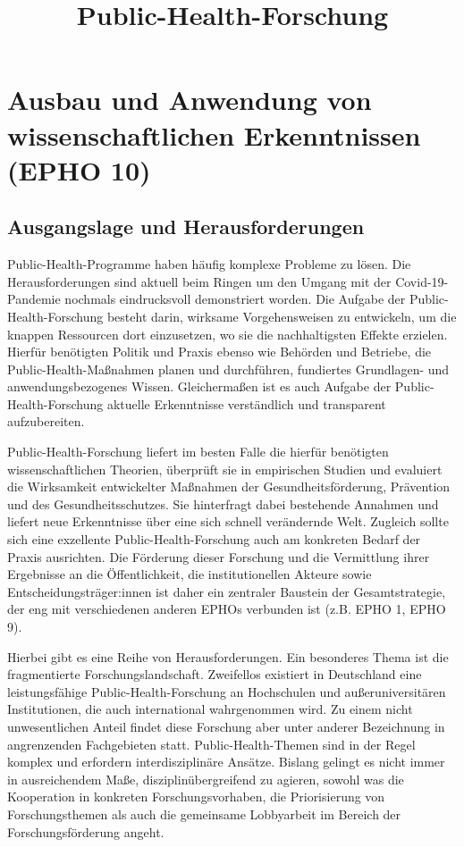 \documentclass{article}
\begin{document}
\title{Public-Health-Forschung}

\maketitle


\section{Ausbau und Anwendung von wissenschaftlichen Erkenntnissen (EPHO 10) }\label{H1274360}



\subsection{Ausgangslage und Herausforderungen}\label{H349095}



Public-Health-Programme haben häufig komplexe Probleme zu lösen. Die Herausforderungen sind aktuell beim Ringen um den Umgang mit der Covid-19-Pandemie nochmals eindrucksvoll demonstriert worden. Die Aufgabe der Public-Health-Forschung besteht darin, wirksame Vorgehensweisen zu entwickeln, um die knappen Ressourcen dort einzusetzen, wo sie die nachhaltigsten Effekte erzielen. Hierfür benötigten Politik und Praxis ebenso wie Behörden und Betriebe, die Public-Health-Maßnahmen planen und durchführen, fundiertes Grundlagen- und anwendungsbezogenes Wissen. Gleichermaßen ist es auch Aufgabe der Public-Health-Forschung aktuelle Erkenntnisse verständlich und transparent aufzubereiten.


Public-Health-Forschung liefert im besten Falle die hierfür benötigten wissenschaftlichen Theorien, überprüft sie in empirischen Studien und evaluiert die Wirksamkeit entwickelter Maßnahmen der Gesundheitsförderung, Prävention und des Gesundheitsschutzes. Sie hinterfragt dabei bestehende Annahmen und liefert neue Erkenntnisse über eine sich schnell verändernde Welt. Zugleich sollte sich eine exzellente Public-Health-Forschung auch am konkreten Bedarf der Praxis ausrichten. Die Förderung dieser Forschung und die Vermittlung ihrer Ergebnisse an die Öffentlichkeit, die institutionellen Akteure sowie Entscheidungsträger:innen ist daher ein zentraler Baustein der Gesamtstrategie, der eng mit verschiedenen anderen EPHOs verbunden ist (z.B. EPHO 1, EPHO 9).


Hierbei gibt es eine Reihe von Herausforderungen. Ein besonderes Thema ist die fragmentierte Forschungslandschaft. Zweifellos existiert in Deutschland eine leistungsfähige Public-Health-Forschung an Hochschulen und außeruniversitären Institutionen, die auch international wahrgenommen wird. Zu einem nicht unwesentlichen Anteil findet diese Forschung aber unter anderer Bezeichnung in angrenzenden Fachgebieten statt. Public-Health-Themen sind in der Regel komplex und erfordern interdisziplinäre Ansätze. Bislang gelingt es nicht immer in ausreichendem Maße, disziplinübergreifend zu agieren, sowohl was die Kooperation in konkreten Forschungsvorhaben, die Priorisierung von Forschungsthemen als auch die gemeinsame Lobbyarbeit im Bereich der Forschungsförderung angeht. 
\end{document}
